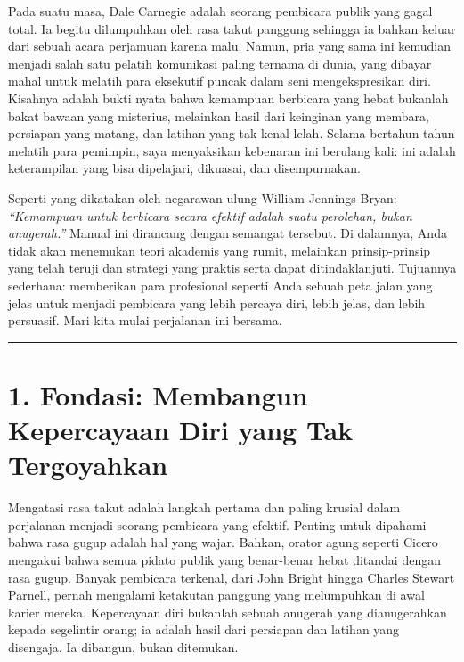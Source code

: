 \documentclass[
  letterpaper,
  DIV=11,
  numbers=noendperiod]{scrreprt}
\begin{document}
Pada suatu masa, Dale Carnegie adalah seorang pembicara publik yang
gagal total. Ia begitu dilumpuhkan oleh rasa takut panggung sehingga ia
bahkan keluar dari sebuah acara perjamuan karena malu. Namun, pria yang
sama ini kemudian menjadi salah satu pelatih komunikasi paling ternama
di dunia, yang dibayar mahal untuk melatih para eksekutif puncak dalam
seni mengekspresikan diri. Kisahnya adalah bukti nyata bahwa kemampuan
berbicara yang hebat bukanlah bakat bawaan yang misterius, melainkan
hasil dari keinginan yang membara, persiapan yang matang, dan latihan
yang tak kenal lelah. Selama bertahun-tahun melatih para pemimpin, saya
menyaksikan kebenaran ini berulang kali: ini adalah keterampilan yang
bisa dipelajari, dikuasai, dan disempurnakan.

Seperti yang dikatakan oleh negarawan ulung William Jennings Bryan:
\emph{``Kemampuan untuk berbicara secara efektif adalah suatu perolehan,
bukan anugerah.''} Manual ini dirancang dengan semangat tersebut. Di
dalamnya, Anda tidak akan menemukan teori akademis yang rumit, melainkan
prinsip-prinsip yang telah teruji dan strategi yang praktis serta dapat
ditindaklanjuti. Tujuannya sederhana: memberikan para profesional
seperti Anda sebuah peta jalan yang jelas untuk menjadi pembicara yang
lebih percaya diri, lebih jelas, dan lebih persuasif. Mari kita mulai
perjalanan ini bersama.

\begin{center}\rule{0.5\linewidth}{0.5pt}\end{center}


\chapter{1. Fondasi: Membangun Kepercayaan Diri yang Tak
Tergoyahkan}\label{fondasi-membangun-kepercayaan-diri-yang-tak-tergoyahkan}

Mengatasi rasa takut adalah langkah pertama dan paling krusial dalam
perjalanan menjadi seorang pembicara yang efektif. Penting untuk
dipahami bahwa rasa gugup adalah hal yang wajar. Bahkan, orator agung
seperti Cicero mengakui bahwa semua pidato publik yang benar-benar hebat
ditandai dengan rasa gugup. Banyak pembicara terkenal, dari John Bright
hingga Charles Stewart Parnell, pernah mengalami ketakutan panggung yang
melumpuhkan di awal karier mereka. Kepercayaan diri bukanlah sebuah
anugerah yang dianugerahkan kepada segelintir orang; ia adalah hasil
dari persiapan dan latihan yang disengaja. Ia dibangun, bukan ditemukan.
\end{document}

